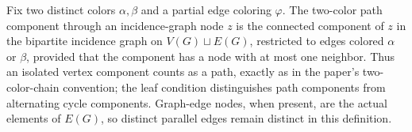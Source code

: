 \begin{definition}
Fix two distinct colors \(\alpha,\beta\) and a partial edge coloring \(\varphi\).
The two-color path component through an incidence-graph node \(z\) is the
connected component of \(z\) in the bipartite incidence graph on
\(V(G)\sqcup E(G)\), restricted to edges colored \(\alpha\) or \(\beta\),
provided that the component has a node with at most one neighbor.  Thus an
isolated vertex component counts as a path, exactly as in the paper's
two-color-chain convention; the leaf condition distinguishes path
components from alternating cycle components.  Graph-edge nodes, when
present, are the actual elements of \(E(G)\), so distinct parallel edges
remain distinct in this definition.
\end{definition}
